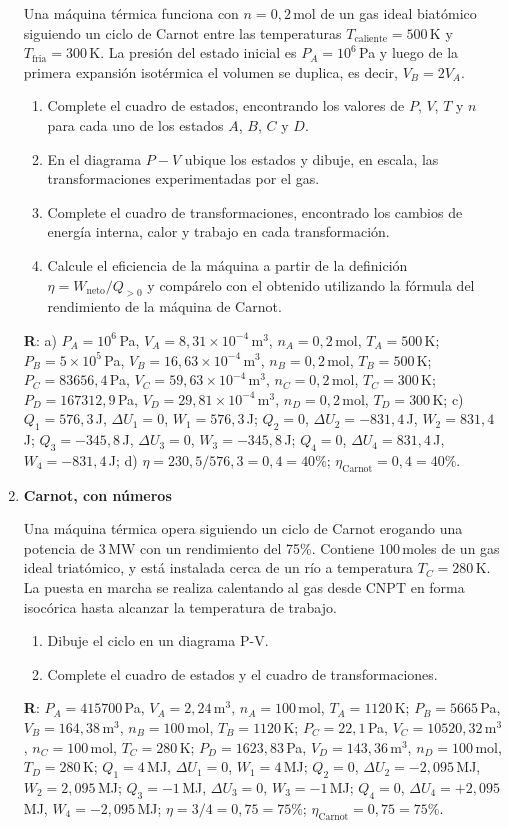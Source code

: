 \documentclass[a4paper,12pt]{article}
\begin{document}
\begin{enumerate}
		Una máquina térmica funciona con $n=0,2$\,mol de un gas ideal biatómico
		siguiendo un ciclo de Carnot entre las temperaturas
		$T_{\mathrm{caliente}}=500$\,K y $T_{\mathrm{fria}}=300$\,K. La presión
		del estado inicial es $P_A=10^6$\,Pa y luego de la primera expansión
		isotérmica el volumen se duplica, es decir, $V_B = 2 V_A$.
		\begin{enumerate}
			\item Complete el cuadro de estados, encontrando los valores de
				$P$, $V$, $T$ y $n$ para cada uno de los estados $A$, $B$, $C$
				y $D$. 
			\item En el diagrama $P-V$ ubique los estados y dibuje, en escala,
				las transformaciones experimentadas por el gas.
			\item Complete el cuadro de transformaciones, encontrado los
				cambios de energía interna, calor y trabajo en cada
				transformación.
			\item Calcule el eficiencia de la máquina a partir de la definición
				$\eta=W_{\mathrm{neto}} / Q_{>0}$ y compárelo con el obtenido
				utilizando la fórmula del rendimiento de la máquina de Carnot. 
		\end{enumerate}
		{\bf{R}}: a) 
		$P_A=10^6$\,Pa, $V_A=8,31\times10^{-4}$\,m$^3$, $n_A=0,2$\,mol,
		$T_A=500$\,K; $P_B=5\times 10^5$\,Pa, $V_B=16,63\times10^{-4}$\,m$^3$,
		$n_B=0,2$\,mol, $T_B=500$\,K; $P_C=83656,4$\,Pa,
		$V_C=59,63\times10^{-4}$\,m$^3$, $n_C=0,2$\,mol, $T_C=300$\,K;
		$P_D=167312,9$\,Pa, $V_D=29,81\times10^{-4}$\,m$^3$, $n_D=0,2$\,mol,
		$T_D=300$\,K; c) $Q_1=576,3$\,J, $\Delta U_1=0$, $W_1=576,3$\,J;
		$Q_2=0$, $\Delta U_2=-831,4$\,J, $W_2=831,4$\,J; $Q_3=-345,8$\,J,
		$\Delta U_3=0$, $W_3=-345,8$\,J; $Q_4=0$, $\Delta U_4=831,4$\,J,
		$W_4=-831,4$\,J; d) $\eta=230,5/576,3 = 0,4 = 40\%$;
		$\eta_{\mathrm{Carnot}} = 0,4 = 40\%$.

	\item {\bf{Carnot, con números}}

		Una máquina térmica opera siguiendo un ciclo de Carnot erogando una
		potencia de $3$\,MW con un rendimiento del 75\%.  Contiene $100$\,moles de
		un gas ideal triatómico, y está instalada cerca de un río a temperatura
		$T_C=280$\,K. La puesta en marcha se realiza calentando al gas desde
		CNPT en forma isocórica hasta alcanzar la temperatura de trabajo.
		\begin{enumerate}
			\item Dibuje el ciclo en un diagrama P-V.
			\item Complete el cuadro de estados y el cuadro de transformaciones.
		\end{enumerate}
		{\bf{R}}:  
		$P_A=415700$\,Pa, $V_A=2,24$\,m$^3$, $n_A=100$\,mol, $T_A=1120$\,K; 
		$P_B=5665$\,Pa, $V_B=164,38$\,m$^3$, $n_B=100$\,mol, $T_B=1120$\,K; 
		$P_C=22,1$\,Pa, $V_C=10520,32$\,m$^3$, $n_C=100$\,mol, $T_C=280$\,K; 
		$P_D=1623,83$\,Pa, $V_D=143,36$\,m$^3$, $n_D=100$\,mol, $T_D=280$\,K; 
		$Q_1=4$\,MJ, $\Delta U_1=0$, $W_1=4$\,MJ;
		$Q_2=0$, $\Delta U_2=-2,095$\,MJ, $W_2=2,095$\,MJ;
		$Q_3=-1$\,MJ, $\Delta U_3=0$, $W_3=-1$\,MJ;
		$Q_4=0$, $\Delta U_4=+2,095$\,MJ, $W_4=-2,095$\,MJ;
		$\eta=3/4 = 0,75 = 75\%$; $\eta_{\mathrm{Carnot}} = 0,75 = 75\%$.
	

\end{enumerate}
\end{document}

